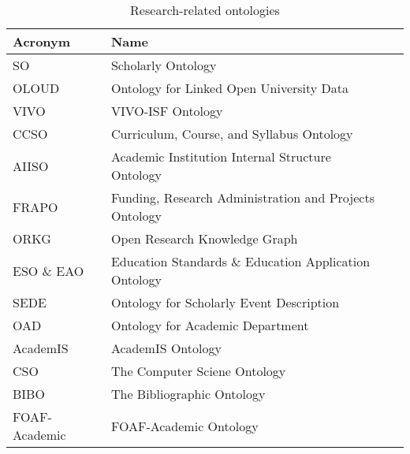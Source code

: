 \begin{table}[]
\centering
\caption{Research-related ontologies}
\label{tab:research-related-ontologies}
\begin{tabular}{llr}
\toprule
\textbf{Acronym} & \textbf{Name}                                                                             \\ \midrule
SO            & Scholarly Ontology & \cite{DBLP:journals/jodl/PertsasC17}                                      \\ \midrule
OLOUD         & Ontology for Linked Open University Data & \cite{10.12700/APH.14.4.2017.4.4}                   \\ \midrule
VIVO          & VIVO-ISF Ontology & \cite{DBLP:series/synthesis/2012Borner}                                    \\ \midrule
CCSO          & Curriculum, Course, and Syllabus Ontology & \cite{DBLP:conf/esws/KatisKAV18}                   \\ \midrule
AIISO         & Academic Institution Internal Structure Ontology & \cite{DBLP:conf/incos/KalemiM11}            \\ \midrule
FRAPO         & Funding, Research Administration and Projects Ontology & \cite{Frapo}                          \\ \midrule
ORKG          & Open Research Knowledge Graph & \cite{DBLP:conf/kcap/OelenJFSA19}                              \\ \midrule
ESO \& EAO    & Education Standards \& Education Application Ontology & \cite{DBLP:conf/semweb/RashidM18}      \\ \midrule
SEDE          & Ontology for Scholarly Event Description & \cite{DBLP:journals/jis/JeongK10}                   \\ \midrule
OAD           & Ontology for Academic Department & \cite{An:OAD}                                               \\ \midrule
AcademIS      & AcademIS Ontology & \cite{DBLP:conf/pci/TriperinaST13}                                         \\ \midrule
CSO           & The Computer Sciene Ontology & \cite{DBLP:conf/semweb/SalatinoTMOM18}                          \\ \midrule
BIBO          & The Bibliographic Ontology & \cite{bibo}                                                       \\ \midrule
FOAF-Academic & FOAF-Academic Ontology & \cite{DBLP:conf/incos/KalemiM11}                                      \\ \midrule

\end{tabular}
\end{table}
